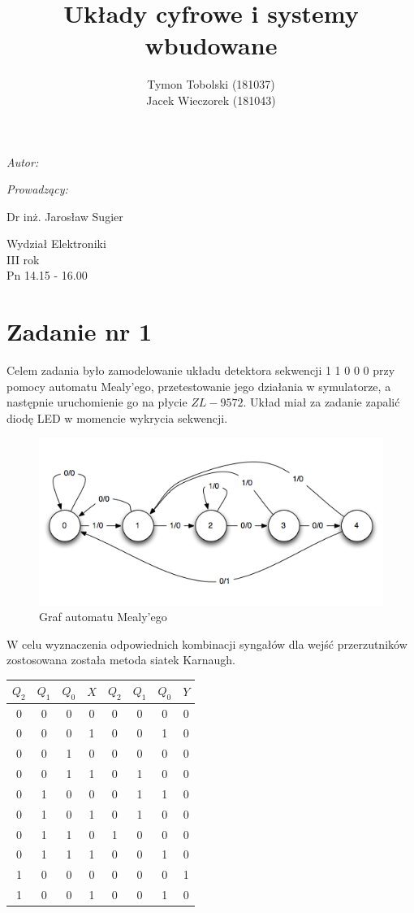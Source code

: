 \documentclass[wide,a4paper,titlepage,12pt] {article}
\title{Układy cyfrowe i systemy wbudowane}
\author{Tymon Tobolski (181037)\\ Jacek Wieczorek (181043)}
\makeatletter
\renewcommand{\maketitle}{
\begin{titlepage}
  \begin{center}
    \vspace*{3cm}
    \LARGE \@title \par
    \vspace{2cm}
    \textit{\small Autor:}\par
    \normalsize \@author\par \normalsize
    \vspace{3cm}
    \textit{\small Prowadzący:}\par
    Dr inż. Jarosław Sugier \par
    \vspace{2cm}
    Wydział Elektroniki\\ III rok\\ Pn 14.15 - 16.00\par
    \vspace{4cm}
    \small \@date
  \end{center}
\end{titlepage}
}
\makeatother
\begin{document}
\maketitle
  \section{Zadanie nr 1}
  Celem zadania było zamodelowanie układu detektora sekwencji 1 1 0 0 0 przy pomocy automatu Mealy'ego, przetestowanie jego działania w symulatorze, a następnie uruchomienie go na płycie $ZL-9572$. Układ miał za zadanie zapalić diodę LED w momencie wykrycia sekwencji.

  \begin{figure}[htbp]
    \begin{center}
      \includegraphics[scale=0.7]{mealy-graf.png}
      \caption{Graf automatu Mealy'ego}
     \end{center}
  \end{figure}


  W celu wyznaczenia odpowiednich kombinacji syngałów dla wejść przerzutników zostosowana została metoda siatek Karnaugh.


  \begin{center}
    \begin{tabular}{|c|c|c|c||c|c|c|c|}
      \hline
      $Q_{2}$ & $Q_{1}$ & $Q_{0}$ & $X$ & $Q_{2}$ & $Q_{1}$ & $Q_{0}$ & $Y$ \\
      \hline
      0 & 0 & 0 & 0 & 0 & 0 & 0 & 0 \\
      0 & 0 & 0 & 1 & 0 & 0 & 1 & 0 \\
      0 & 0 & 1 & 0 & 0 & 0 & 0 & 0 \\
      0 & 0 & 1 & 1 & 0 & 1 & 0 & 0 \\
      0 & 1 & 0 & 0 & 0 & 1 & 1 & 0 \\
      0 & 1 & 0 & 1 & 0 & 1 & 0 & 0 \\
      0 & 1 & 1 & 0 & 1 & 0 & 0 & 0 \\
      0 & 1 & 1 & 1 & 0 & 0 & 1 & 0 \\
      1 & 0 & 0 & 0 & 0 & 0 & 0 & 1 \\
      1 & 0 & 0 & 1 & 0 & 0 & 1 & 0 \\
      \hline
    \end{tabular}
  \end{center}
\end{document}
